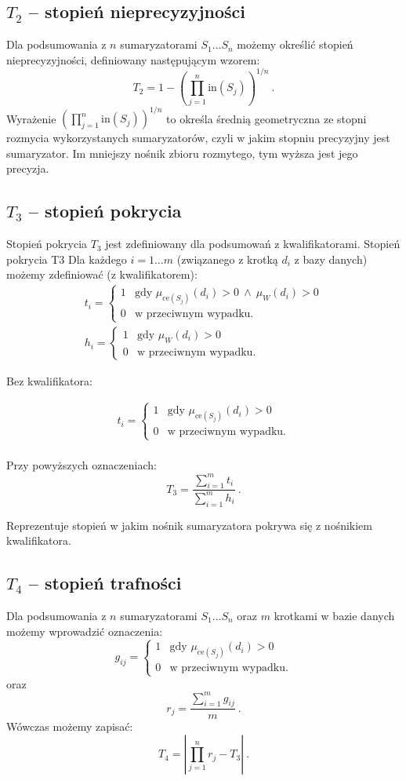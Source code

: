 \documentclass{classrep}
\begin{document}
\subsection{\(T_2\) -- stopień nieprecyzyjności}
Dla podsumowania z \(n\) sumaryzatorami \(S_1 \ldots S_n\) możemy określić stopień nieprecyzyjności,
definiowany następującym wzorem:
\[T_2 = 1 - \left(\prod_{j=1}^{n} \mathrm{in}(S_j)\right)^{1/n} ~\mbox{.}\]
Wyrażenie \(\left(\prod_{j=1}^{n} \mathrm{in}(S_j)\right)^{1/n}\) to określa średnią geometryczna ze stopni rozmycia wykorzystanych sumaryzatorów, czyli w jakim stopniu precyzyjny jest sumaryzator. Im mniejszy nośnik zbioru rozmytego, tym wyższa jest jego precyzja.
   

\subsection{\(T_3\) -- stopień pokrycia}
Stopień pokrycia \(T_3\) jest zdefiniowany dla podsumowań z kwalifikatorami. Stopień pokrycia T3 
Dla każdego \(i=1\ldots m\) (związanego z krotką \(d_i\) z bazy
danych) możemy zdefiniować (z kwalifikatorem):
\[
\begin{array}{l}
t_i = \begin{cases}
1 & \mbox{gdy } \mu_{\mathrm{ce}(S_j)}(d_i) > 0 ~ \wedge ~ \mu_{W}(d_i) > 0 \\
0 & \mbox{w przeciwnym wypadku.}
\end{cases} \\
h_i = \begin{cases}
1 & \mbox{gdy } \mu_{W}(d_i) > 0 \\
0 & \mbox{w przeciwnym wypadku.}
\end{cases}
\end{array}\]

Bez kwalifikatora:

\[
\begin{array}{l}
t_i = \begin{cases}
1 & \mbox{gdy } \mu_{\mathrm{ce}(S_j)}(d_i) > 0  \\
0 & \mbox{w przeciwnym wypadku.}
\end{cases} \\
\end{array}\]

Przy powyższych oznaczeniach:
\[T_3 = \frac{\sum_{i=1}^{m} t_i}{\sum_{i=1}^{m} h_i} ~\mbox{.}\]

Reprezentuje stopień w jakim nośnik sumaryzatora pokrywa się z nośnikiem kwalifikatora.


\subsection{\(T_4\) -- stopień trafności}
Dla podsumowania z \(n\) sumaryzatorami \(S_1 \ldots S_n\)
oraz \(m\) krotkami w bazie danych możemy wprowadzić oznaczenia:
\[g_{ij} = \begin{cases}
1 & \mbox{gdy } \mu_{\mathrm{ce}(S_j)}(d_i) > 0 \\
0 & \mbox{w przeciwnym wypadku.}
\end{cases}\]
oraz
\[r_j = \frac{\sum_{i=1}^{m} g_{ij}}{m} ~\mbox{.}\]
Wówczas możemy zapisać:
\[T_4 = \left| \prod_{j=1}^{n} r_j - T_3\right| ~\mbox{.}\]
\end{document}
